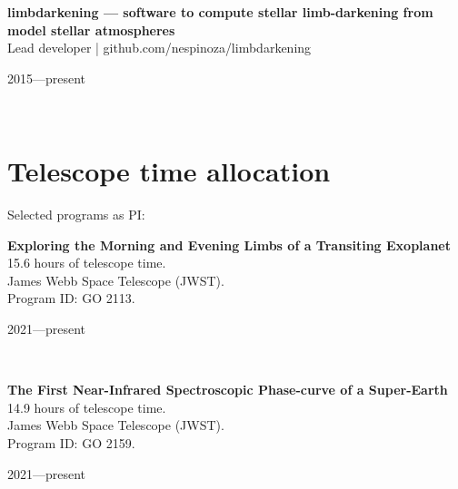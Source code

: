 \documentclass[12pt, a4paper]{article} %
\begin{document}
\begin{minipage}[t]{0.7\textwidth}
\begin{flushleft}%
  \setlength{\leftskip}{0.2cm}%
\textbf{limbdarkening --- software to compute stellar limb-darkening from model stellar atmospheres}\\
Lead developer | github.com/nespinoza/limbdarkening
\end{flushleft}
\end{minipage}
\begin{minipage}[t]{0.3\textwidth}
\hfill 2015---present
\end{minipage}\\

\section*{Telescope time allocation}
Selected programs as PI:\\

\begin{minipage}[t]{0.7\textwidth}
\begin{flushleft}%
  \setlength{\leftskip}{0.2cm}%
\textbf{Exploring the Morning and Evening Limbs of a Transiting Exoplanet}\\
15.6 hours of telescope time.\\
James Webb Space Telescope (JWST).\\
Program ID: GO 2113.
\end{flushleft}
\end{minipage}
\begin{minipage}[t]{0.3\textwidth}
\hfill 2021---present
\end{minipage}\\


\begin{minipage}[t]{0.7\textwidth}
\begin{flushleft}%
  \setlength{\leftskip}{0.2cm}%
\textbf{The First Near-Infrared Spectroscopic Phase-curve of a Super-Earth}\\
14.9 hours of telescope time.\\
James Webb Space Telescope (JWST).\\
Program ID: GO 2159.
\end{flushleft}
\end{minipage}
\begin{minipage}[t]{0.3\textwidth}
\hfill 2021---present
\end{minipage}\\
\end{document}
